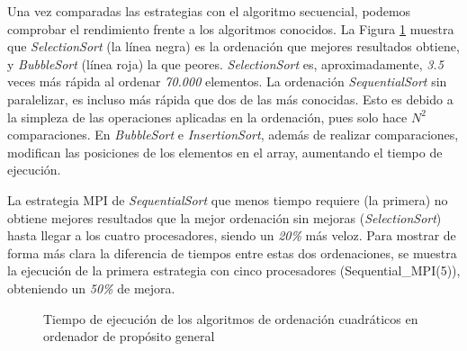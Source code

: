 	
		
		
		Una vez comparadas las estrategias con el algoritmo secuencial, podemos comprobar el rendimiento frente a los algoritmos conocidos. La Figura \ref{fig:ordenaciones_cuadraticas} muestra que \textit{SelectionSort} (la línea negra) es la ordenación que mejores resultados obtiene, y \textit{BubbleSort} (línea roja) la que peores. \textit{SelectionSort} es, aproximadamente, \textit{3.5} veces más rápida al ordenar \textit{70.000} elementos. La ordenación \textit{SequentialSort} sin paralelizar, es incluso más rápida que dos de las más conocidas. Esto es debido a la simpleza de las operaciones aplicadas en la ordenación, pues solo hace \(N^{2}\) comparaciones. En \textit{BubbleSort} e \textit{InsertionSort}, además de realizar comparaciones, modifican las posiciones de los elementos en el array, aumentando el tiempo de ejecución.
		
		La estrategia MPI de \textit{SequentialSort} que menos tiempo requiere (la primera) no obtiene mejores resultados que la mejor ordenación sin mejoras (\textit{SelectionSort}) hasta llegar a los cuatro procesadores, siendo un \textit{20\%} más veloz. Para mostrar de forma más clara la diferencia de tiempos entre estas dos ordenaciones, se muestra la ejecución de la primera estrategia con cinco procesadores (Sequential\_MPI(5)), obteniendo un \textit{50\%} de mejora.
		
		
		\begin{figure}[!h]
			\centering
			\caption{Tiempo de ejecución de los algoritmos de ordenación cuadráticos en ordenador de propósito general}
			\label{fig:ordenaciones_cuadraticas}
		\end{figure}
		
